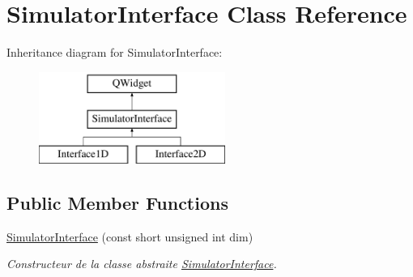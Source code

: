 \hypertarget{class_simulator_interface}{}\section{Simulator\+Interface Class Reference}
\label{class_simulator_interface}
Inheritance diagram for Simulator\+Interface\+:\begin{figure}[H]
\begin{center}
\leavevmode
\includegraphics[height=3.000000cm]{class_simulator_interface}
\end{center}
\end{figure}
\subsection*{Public Member Functions}
\begin{DoxyCompactItemize}
\item 
\mbox{\hyperlink{class_simulator_interface_a031b227cc58e20c93aa5b91f08eaab8a}{Simulator\+Interface}} (const short unsigned int dim)
\begin{DoxyCompactList}\small\item\em Constructeur de la classe abstraite \mbox{\hyperlink{class_simulator_interface}{Simulator\+Interface}}. \end{DoxyCompactList}\end{DoxyCompactItemize}
